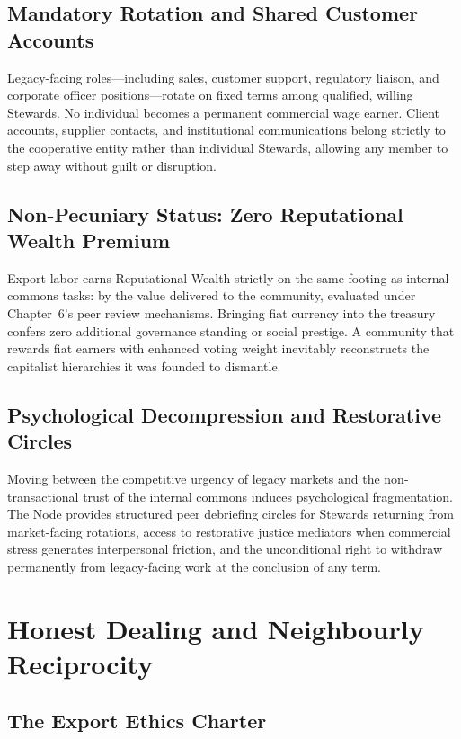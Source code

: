 \subsection{Mandatory Rotation and Shared Customer Accounts}

Legacy-facing roles—including sales, customer support, regulatory liaison, and corporate officer positions—rotate on fixed terms among qualified, willing Stewards. No individual becomes a permanent commercial wage earner. Client accounts, supplier contacts, and institutional communications belong strictly to the cooperative entity rather than individual Stewards, allowing any member to step away without guilt or disruption.

\subsection{Non-Pecuniary Status: Zero Reputational Wealth Premium}

Export labor earns Reputational Wealth strictly on the same footing as internal commons tasks: by the value delivered to the community, evaluated under Chapter~6's peer review mechanisms. Bringing fiat currency into the treasury confers zero additional governance standing or social prestige. A community that rewards fiat earners with enhanced voting weight inevitably reconstructs the capitalist hierarchies it was founded to dismantle.

\subsection{Psychological Decompression and Restorative Circles}

Moving between the competitive urgency of legacy markets and the non-transactional trust of the internal commons induces psychological fragmentation. The Node provides structured peer debriefing circles for Stewards returning from market-facing rotations, access to restorative justice mediators when commercial stress generates interpersonal friction, and the unconditional right to withdraw permanently from legacy-facing work at the conclusion of any term.

\section{Honest Dealing and Neighbourly Reciprocity}

\subsection{The Export Ethics Charter}

